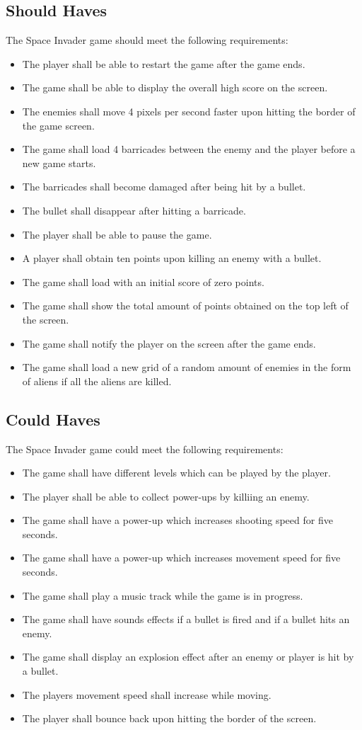 \subsection{Should Haves}
The Space Invader game should meet the following requirements:
\begin{itemize}
	\item The player shall be able to restart the game after the game ends.
	\item The game shall be able to display the overall high score on the screen.
	\item The enemies shall move 4 pixels per second faster upon hitting the border of the game screen.
	\item The game shall load 4 barricades between the enemy and the player before a new game starts.
	\item The barricades shall become damaged after being hit by a bullet.
	\item The bullet shall disappear after hitting a barricade.
	\item The player shall be able to pause the game.
	\item A player shall obtain ten points upon killing an enemy with a bullet.
	\item The game shall load with an initial score of zero points.
	\item The game shall show the total amount of points obtained on the top left of the screen.	
	\item The game shall notify the player on the screen after the game ends.	
	\item The game shall load a new grid of a  random amount of enemies in the form of aliens if all the aliens are killed.
\end{itemize}

\subsection{Could Haves}
The Space Invader game could meet the following requirements:
\begin{itemize}
	\item The game shall have different levels which can be played by the player.
	\item The player shall be able to collect power-ups by killiing an enemy.
	\item The game shall have a power-up which increases shooting speed for five seconds.
	\item The game shall have a power-up which increases movement speed for five seconds.
	\item The game shall play a music track while the game is in progress.
	\item The game shall have sounds effects if a bullet is fired and if a bullet hits an enemy.
	\item The game shall display an explosion effect after an enemy or player is hit by a bullet.
	\item The players movement speed shall increase while moving.
	\item The player shall bounce back upon hitting the border of the screen.
\end{itemize}

